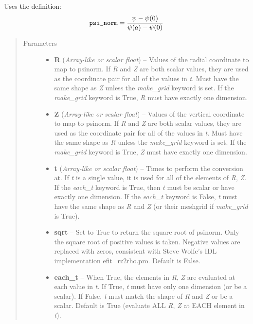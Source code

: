 \documentclass[letterpaper,10pt,english]{sphinxmanual}
\begin{document}
\begin{fulllineitems}
\begin{fulllineitems}
Uses the definition:
\begin{gather}
\begin{split}\texttt{psi\_norm} = \frac{\psi - \psi(0)}{\psi(a) - \psi(0)}\end{split}\notag
\end{gather}\begin{quote}\begin{description}
\item[{Parameters}] \leavevmode\begin{itemize}
\item {} 
\textbf{R} (\emph{Array-like or scalar float}) -- Values of the radial coordinate to
map to psinorm. If \emph{R} and \emph{Z} are both scalar values,
they are used as the coordinate pair for all of the values in
\emph{t}. Must have the same shape as \emph{Z} unless the \emph{make\_grid}
keyword is set. If the \emph{make\_grid} keyword is True, \emph{R} must
have exactly one dimension.

\item {} 
\textbf{Z} (\emph{Array-like or scalar float}) -- Values of the vertical coordinate to
map to psinorm. If \emph{R} and \emph{Z} are both scalar values,
they are used as the coordinate pair for all of the values in
\emph{t}. Must have the same shape as \emph{R} unless the \emph{make\_grid}
keyword is set. If the \emph{make\_grid} keyword is True, \emph{Z} must
have exactly one dimension.

\item {} 
\textbf{t} (\emph{Array-like or scalar float}) -- Times to perform the conversion at.
If \emph{t} is a single value, it is used for all of the elements of
\emph{R}, \emph{Z}. If the \emph{each\_t} keyword is True, then \emph{t} must be
scalar or have exactly one dimension. If the \emph{each\_t} keyword is
False, \emph{t} must have the same shape as \emph{R} and \emph{Z} (or their
meshgrid if \emph{make\_grid} is True).

\item {} 
\textbf{sqrt} -- Set to True to return the square root of psinorm.
Only the square root of positive values is taken. Negative
values are replaced with zeros, consistent with Steve Wolfe's
IDL implementation efit\_rz2rho.pro. Default is False.

\item {} 
\textbf{each\_t} -- When True, the elements in \emph{R}, \emph{Z} are evaluated
at each value in \emph{t}. If True, \emph{t} must have only one dimension
(or be a scalar). If False, \emph{t} must match the shape of \emph{R} and
\emph{Z} or be a scalar. Default is True (evaluate ALL \emph{R}, \emph{Z} at
EACH element in \emph{t}).


\end{itemize}
\end{description}
\end{quote}
\end{fulllineitems}
\end{fulllineitems}
\end{document}
